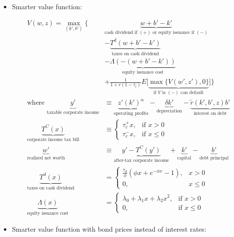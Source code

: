 \documentclass{article}
\begin{document}
\begin{itemize}
\pagebreak

\item Smarter value function:

\begin{align*}
V(w, z) =
\max_{(k', b')} \Bigg\{ 
& \underbrace{w + b' - k'}_{\text{cash dividend if } (+) \text{ or equity issuance if } (-)} \\ 
&- \underbrace{T^d(w + b' - k')}_{\text{taxes on cash dividend}} \\
&- \underbrace{\Lambda(-(w + b' - k'))}_{\text{equity issuance cost}} \\
&+ \frac{1}{1+r(1-\tau_i)} E\Big[\underbrace{\max\{ V(w', z'), 0\}}_{\text{if }V \text{ is } (-) \text{ can default}}\Big] \Bigg\} \\
\text{where }
\underbrace{y'}_{\text{taxable corporate income}} &\equiv \underbrace{z' (k')^\alpha}_{\text{operating profits}} - \underbrace{\delta k'}_{\text{depreciation}} - \underbrace{\tilde r(k', b', z) b'}_{\text{interest on debt}} \\
\underbrace{T^C(x)}_{\text{corporate income tax bill}} &\equiv 
\begin{cases} 
\tau_c^+ x, & \text{if }x > 0 \\
\tau_c^- x, & \text{if }x \le 0
\end{cases}\\
\underbrace{w'}_{\text{realized net worth}} &\equiv \underbrace{y' - T^C(y')}_{\text{after-tax corporate income}}+ \underbrace{k'}_{\text{capital}}  - \underbrace{b'}_{\text{debt principal}} \\
\underbrace{T^d(x)}_{\text{taxes on cash dividend}} &= 
\begin{cases}
\frac{\bar \tau_d}{\phi}(\phi x + e^{-\phi x} - 1), & x > 0 \\
0,& x \le 0
\end{cases} \\
\underbrace{\Lambda(x)}_{\text{equity issuance cost}} &= 
\begin{cases} 
\lambda_0 + \lambda_1 x + \lambda_2 x^2, & \text{if }x > 0 \\
0, & \text{if }x \le 0
\end{cases}
\end{align*}

\pagebreak

\item Smarter value function with bond prices instead of interest rates:


\end{itemize}
\end{document}
